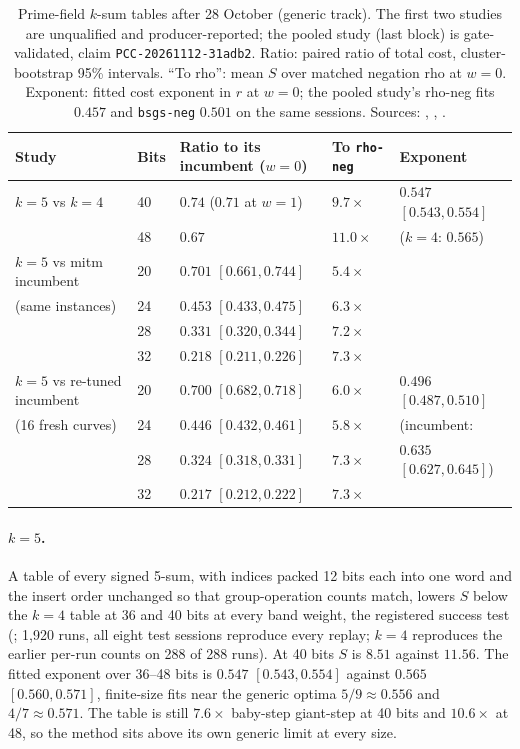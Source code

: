 \begin{table}[t]
\centering\small
\begin{tabular}{@{}lllll@{}}
\toprule
Study & Bits & Ratio to its incumbent ($w=0$) & To \texttt{rho-neg} & Exponent \\
\midrule
$k=5$ vs $k=4$ & 40 & $0.74$ ($0.71$ at $w=1$) & $9.7\times$ & $0.547$ $[0.543,0.554]$ \\
 & 48 & $0.67$ & $11.0\times$ & ($k=4$: $0.565$) \\
\addlinespace
$k=5$ vs mitm incumbent & 20 & $0.701$ $[0.661,0.744]$ & $5.4\times$ & \\
(same instances) & 24 & $0.453$ $[0.433,0.475]$ & $6.3\times$ & \\
 & 28 & $0.331$ $[0.320,0.344]$ & $7.2\times$ & \\
 & 32 & $0.218$ $[0.211,0.226]$ & $7.3\times$ & \\
\addlinespace
$k=5$ vs re-tuned incumbent & 20 & $0.700$ $[0.682,0.718]$ & $6.0\times$ & $0.496$ $[0.487,0.510]$ \\
(16 fresh curves) & 24 & $0.446$ $[0.432,0.461]$ & $5.8\times$ & (incumbent: \\
 & 28 & $0.324$ $[0.318,0.331]$ & $7.3\times$ & $0.635$ $[0.627,0.645]$) \\
 & 32 & $0.217$ $[0.212,0.222]$ & $7.3\times$ & \\
\bottomrule
\end{tabular}
\caption[]{Prime-field $k$-sum tables after 28 October (generic track). The
first two studies are unqualified and producer-reported; the pooled study
(last block) is gate-validated, claim \texttt{PCC-20261112-31adb2}. Ratio: paired ratio of total cost,
cluster-bootstrap 95\% intervals. ``To rho'': mean $S$ over matched
negation rho at $w=0$. Exponent: fitted cost exponent in $r$ at $w=0$;
the pooled study's rho-neg fits $0.457$ and \texttt{bsgs-neg} $0.501$ on
the same sessions. Sources: ,
,
.}
\label{tab:pg-ksum}
\end{table}

\paragraph{$k=5$.} A table of every signed 5-sum, with indices packed 12
bits each into one word and the insert order unchanged so that
group-operation counts match, lowers $S$ below the $k=4$ table at 36 and 40
bits at every band weight, the registered success test
(; 1{,}920 runs, all eight test
sessions reproduce every replay; $k=4$ reproduces the earlier per-run
counts on 288 of 288 runs). At 40 bits $S$ is $8.51$ against $11.56$. The
fitted exponent over 36--48 bits is $0.547$ $[0.543,0.554]$ against $0.565$
$[0.560,0.571]$, finite-size fits near the generic optima
$5/9\approx0.556$ and $4/7\approx0.571$. The table is still $7.6\times$ baby-step giant-step at 40 bits and
$10.6\times$ at 48, so the method sits above its own generic limit at every
size.

